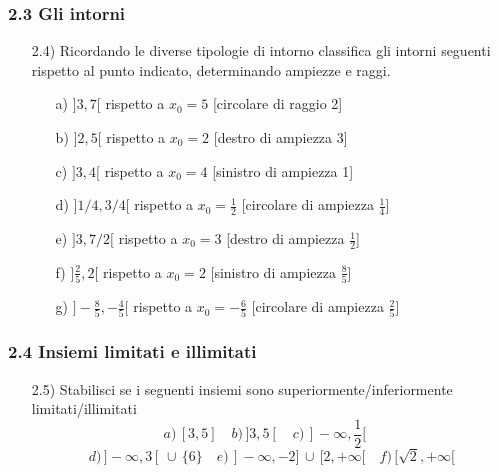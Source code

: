  \subsubsection*{2.3 Gli intorni}
  \begin{itemize}
  \item[2.4)] Ricordando le diverse tipologie di 
intorno classifica gli intorni seguenti rispetto al punto indicato, 
determinando ampiezze e raggi.
  \begin{itemize}
  \item[a)] \(]3, 7[\) rispetto a 
\(x_0=5\)   \hfill   [circolare di raggio 2]
  \item[b)] \(]2, 5[\) rispetto a 
\(x_0=2\)   \hfill  [destro di ampiezza 3]
  \item[c)] \(]3, 4[\) rispetto a 
\(x_0=4\)  \hfill  [sinistro di ampiezza 1]
  \item[d)] \(]1/4, 3/4[\) 
rispetto a \(x_0=\frac{1}{2}\)   \hfill  [circolare di ampiezza \(\frac{1}{4}\)]
  \item[e)] \(]3, 7/2[\) rispetto 
a \(x_0=3\)   \hfill  [destro di ampiezza \(\frac{1}{2}\)] 
  \item[f)] \(]\frac{2}{5}, 2[\) 
rispetto a \(x_0=2\)  \hfill   [sinistro di ampiezza \(\frac{8}{5}\)]
  \item[g)] \(]-\frac{8}{5}, 
-\frac{4}{5}[\) rispetto a \(x_0= -\frac{6}{5}\)   \hfill [circolare di ampiezza 
\(\frac{2}{5}\)]
  \end{itemize}
  \end{itemize}
  \subsubsection*{2.4 Insiemi limitati e illimitati}
  \begin{itemize}
  \item[2.5)]  Stabilisci se i seguenti insiemi 
sono superiormente/inferiormente limitati/illimitati
\[a)\, [3, 5]  \,\,\, \,\,\,   b)\, ]3, 5[  \,\,\, \,\,\,   c)\, ]-\infty, 
\frac{1}{2}[   \,\,\, \,\,\,  \] 
  \[d)\,]-\infty, 3[\,\cup\,\{6\}  \,\,\,\,\,\,  e)\,  ]-\infty, 
-2]\,\cup\,[2, +\infty[ \,\,\,\,\,\,  f)\, [\sqrt{2}, +\infty[\]
  \end{itemize}
